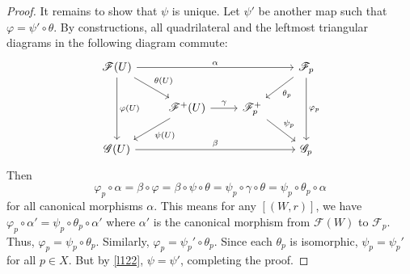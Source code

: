 \documentclass[12pt]{article}
\theoremstyle{remark}
\newcommand{\comment}[1]{}
\begin{document}
\begin{proof}
	It remains to show that $\psi$ is unique. Let $\psi'$ be another map such that $\varphi=\psi'\circ\theta$. By constructions, all quadrilateral and the leftmost triangular diagrams in the following diagram commute:
	\[
	\begin{tikzcd}
\mathscr F(U) \arrow[rrr, "\alpha"] \arrow[rd, "\theta(U)"] \arrow[dd, "\varphi(U)"] &                                                     &                                     & \mathscr F_p \arrow[ld, "\theta_p"] \arrow[dd, "\varphi_p"] \\
                                                                            & \mathscr F^+(U) \arrow[ld, "\psi(U)"] \arrow[r, "\gamma"] & \mathscr F^+_p \arrow[rd, "\psi_p"] &                                                             \\
\mathscr G(U) \arrow[rrr, "\beta"]                                             &                                                     &                                     & \mathscr G_p                                               
\end{tikzcd}
	\]
	Then 
	\[\varphi_p\circ\alpha=\beta\circ\varphi=\beta\circ\psi\circ\theta=\psi_p\circ\gamma\circ\theta=\psi_p\circ\theta_p\circ\alpha\]
	for all canonical morphisms $\alpha$. This means for any $[(W, r)]$, we have $\varphi_p\circ \alpha'=\psi_p\circ\theta_p\circ\alpha'$ where $\alpha'$ is the canonical morphism from $\mathscr F(W)$ to $\mathscr F_p$. Thus, $\varphi_p=\psi_p\circ\theta_p$. Similarly, $\varphi_p=\psi_p'\circ\theta_p$. Since each $\theta_p$ is isomorphic, $\psi_p=\psi_p'$ for all $p\in X$. But by \autoref{l122}, $\psi=\psi'$, completing the proof.
	\comment{
	Note $\{V_p\}$ is a open cover of $U$ and we claim that $t_p|_{V_p\cap V_{p'}}=t_{p'}|_{V_p\cap V_{p'}}$ for every $p,p'\in U$. This is because for any $q\in V_p\cap V_{p'}$,
	\[[(V_p\cap V_{p'}, t_p|_{V_p\cap V_{p'}})]=[(V_p, t_p)]=s_q=[(V_{p'},t_{p'})]=[(V_p\cap V_{p'}, t_{p'}|_{V_p\cap V_{p'}})]\]
	Therefore, there is an open cover of $V_p\cap V_{p'}$ on which $t_p$ and $t_{p'}$ agree. Thus by locality they agree on intersections. Observe that
	\[\varphi(V_p)(t_p)|_{V_p\cap V_{p'}}=\varphi(V_p\cap V_{p'})(t_p|_{V_p\cap V_{p'}})=\varphi(V_p\cap V_{p'})(t_{p'}|_{V_p\cap V_{p'}})=\varphi(V_{p'})(t_{p'})|_{V_p\cap V_{p'}}\]
	so by the gluing condition we get a $g_s\in\mathscr G(U)$ such that $g_s|_{V_p}=\varphi(V_p)(t_p)$ for all $p\in U$. Define $\bar\varphi(U):s\mapsto g_s$.
	
	We claim that $\bar\varphi$ is a morphism of sheaves. This is the same as showing fo any $V\subseteq U$, $\bar\varphi(U)(s)|_V=\bar\varphi(V)(s|_V)$. By construction, $\bar\varphi(U)(s)|_V=g_s|_V$. Let $\{V_p'=V_p\cap V\}$ be an open covering of $V$. Then for any $p$ and $q\in V_p'$, $(s|_{V})_q=[(V, s|_{V})]=[(U, s)]=[(V_p, t_p)]=[(V_p', t_p|_{V_{p'}})]$.
	}
	\end{proof}
	
\end{document}
